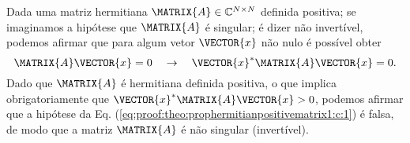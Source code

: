 \begin{myproofT}\label{proof:theo:prophermitianpositivematrix1:c}
Dada uma matriz hermitiana $\MATRIX{A} \in \mathbb{C}^{N \times N}$ definida positiva;
se imaginamos a hipótese que $\MATRIX{A}$ é singular; é dizer não invertível,
podemos afirmar que para algum vetor $\VECTOR{x}$ não nulo
é possível obter
\begin{equation}\label{eq:proof:theo:prophermitianpositivematrix1:c:1}
\MATRIX{A}\VECTOR{x}= 0 
\quad \rightarrow \quad
\VECTOR{x}^{\ast} \MATRIX{A} \VECTOR{x}= 0.
\end{equation}
Dado que $\MATRIX{A}$ é hermitiana definida positiva, 
o que implica obrigatoriamente que $\VECTOR{x}^{\ast} \MATRIX{A} \VECTOR{x}>0$,
podemos afirmar que a hipótese da Eq. (\ref{eq:proof:theo:prophermitianpositivematrix1:c:1}) é falsa, 
de modo que a matriz $\MATRIX{A}$ é não singular (invertível).
\end{myproofT}

